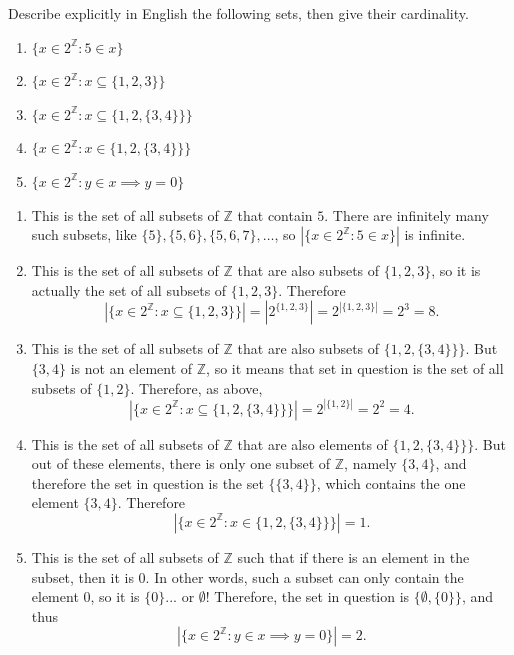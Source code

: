 \documentclass{article}
\newcommand{\Z}{\mathbb{Z}}
\theoremstyle{definition}
\begin{document}
\begin{question}
Describe explicitly in English the following sets, then give their cardinality.

\begin{enumerate}
	\item $\{x \in 2^{\Z} : 5 \in x \}$
	\item $\{x \in 2^{\Z} : x \subseteq \{ 1, 2, 3\} \}$
	\item $\{x \in 2^{\Z} : x \subseteq \{ 1, 2, \{3, 4\} \} \}$
	\item $\{x \in 2^{\Z} : x \in \{ 1, 2, \{3, 4\} \} \}$
	\item $\{x \in 2^{\Z} : y \in x \implies y = 0 \}$
\end{enumerate}
\end{question}
\begin{solution}
\begin{enumerate}
	\item This is the set of all subsets of $\Z$ that contain $5$. There are infinitely many such subsets, like $\{5\}, \{5,6\}, \{5,6, 7\}, \dots$, so $\left | \{x \in 2^{\Z} : 5 \in x \} \right |$ is infinite.
	\item This is the set of all subsets of $\Z$ that are also subsets of $\{1, 2, 3\}$, so it is actually the set of all subsets of $\{1,2,3\}$. Therefore
	\[
	\left |\{x \in 2^{\Z} : x \subseteq \{ 1, 2, 3\} \} \right | = \left | 2^{\{1, 2, 3\}} \right | = 2^{|\{ 1, 2, 3\}|} = 2^3 = 8.
	\]
	
	\item This is the set of all subsets of $\Z$ that are also subsets of $ \{ 1, 2, \{3, 4\} \} \}$. But $\{ 3, 4 \}$ is not an element of $\Z$, so it means that set in question is the set of all subsets of $\{1,2\}$. Therefore, as above, 
	\[
	\left |\{x \in 2^{\Z} : x \subseteq \{ 1, 2, \{3, 4\} \} \} \right | = 2^{|\{1,2 \}|} = 2^2 = 4.
	\]
	
	\item This is the set of all subsets of $\Z$ that are also elements of $ \{ 1, 2, \{3, 4\} \} \}$. But out of these elements, there is only one subset of $\Z$, namely $\{ 3, 4 \}$, and therefore the set in question is the set $\{ \{3,4\} \}$, which contains the one element $\{3,4\}$. Therefore
	\[
	\left | \{x \in 2^{\Z} : x \in \{ 1, 2, \{3, 4\} \} \} \right | = 1.
	\]
	
	\item This is the set of all subsets of $\Z$ such that if there is an element in the subset, then it is $0$. In other words, such a subset can only contain the element $0$, so it is $\{ 0 \}$... or $\emptyset$! Therefore, the set in question is $\{ \emptyset, \{0\}\}$, and thus
	\[
	\left | \{x \in 2^{\Z} : y \in x \implies y = 0 \} \right | = 2.
	\]
\end{enumerate}
\end{solution}
\end{document}
